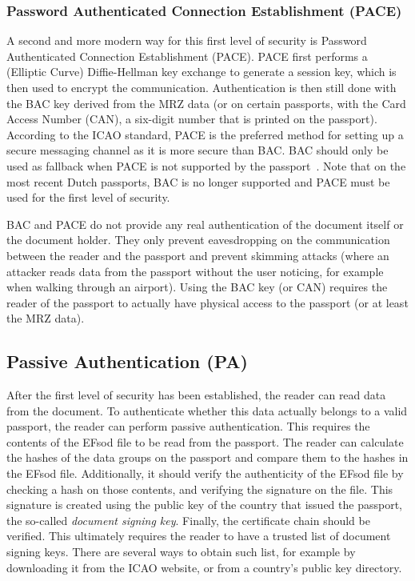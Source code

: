 \subsubsection{Password Authenticated Connection Establishment (PACE)}\label{subsubsec:password-authenticated-connection-establishment}
A second and more modern way for this first level of security is Password Authenticated Connection Establishment (PACE).
PACE first performs a (Elliptic Curve) Diffie-Hellman key exchange to generate a session key, which is then used to encrypt the communication.
Authentication is then still done with the BAC key derived from the MRZ data (or on certain passports, with the Card Access Number (CAN), a six-digit number that is printed on the passport).
According to the ICAO standard, PACE is the preferred method for setting up a secure messaging channel as it is more secure than BAC.
BAC should only be used as fallback when PACE is not supported by the passport~\cite{icao9303securitymechanisms}.
Note that on the most recent Dutch passports, BAC is no longer supported and PACE must be used for the first level of security.


BAC and PACE do not provide any real authentication of the document itself or the document holder.
They only prevent eavesdropping on the communication between the reader and the passport and prevent skimming attacks (where an attacker reads data from the passport without the user noticing, for example when walking through an airport).
Using the BAC key (or CAN) requires the reader of the passport to actually have physical access to the passport (or at least the MRZ data).

\subsection{Passive Authentication (PA)}\label{subsec:passive-authentication}
After the first level of security has been established, the reader can read data from the document.
To authenticate whether this data actually belongs to a valid passport, the reader can perform passive authentication.
This requires the contents of the EFsod file to be read from the passport.
The reader can calculate the hashes of the data groups on the passport and compare them to the hashes in the EFsod file.
Additionally, it should verify the authenticity of the EFsod file by checking a hash on those contents, and verifying the signature on the file.
This signature is created using the public key of the country that issued the passport, the so-called \textit{document signing key}.
Finally, the certificate chain should be verified.
This ultimately requires the reader to have a trusted list of document signing keys.
There are several ways to obtain such list, for example by downloading it from the ICAO website, or from a country's public key directory.

